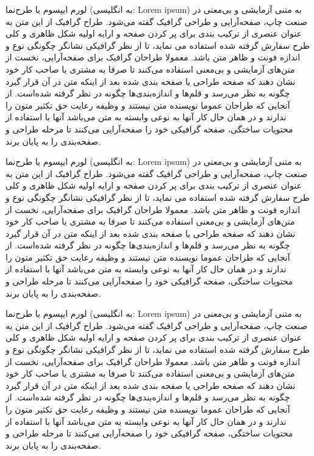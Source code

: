 \documentclass[a4paper, 12pt]{exam}
\begin{document}
\begin{questions}
	\question
	لورم ایپسوم یا طرح‌نما (به انگلیسی: Lorem ipsum) به متنی آزمایشی و بی‌معنی در صنعت چاپ، صفحه‌آرایی و طراحی گرافیک گفته می‌شود. طراح گرافیک از این متن به عنوان عنصری از ترکیب بندی برای پر کردن صفحه و ارایه اولیه شکل ظاهری و کلی طرح سفارش گرفته شده استفاده می نماید، تا از نظر گرافیکی نشانگر چگونگی نوع و اندازه فونت و ظاهر متن باشد. معمولا طراحان گرافیک برای صفحه‌آرایی، نخست از متن‌های آزمایشی و بی‌معنی استفاده می‌کنند تا صرفا به مشتری یا صاحب کار خود نشان دهند که صفحه طراحی یا صفحه بندی شده بعد از اینکه متن در آن قرار گیرد چگونه به نظر می‌رسد و قلم‌ها و اندازه‌بندی‌ها چگونه در نظر گرفته شده‌است. از آنجایی که طراحان عموما نویسنده متن نیستند و وظیفه رعایت حق تکثیر متون را ندارند و در همان حال کار آنها به نوعی وابسته به متن می‌باشد آنها با استفاده از محتویات ساختگی، صفحه گرافیکی خود را صفحه‌آرایی می‌کنند تا مرحله طراحی و صفحه‌بندی را به پایان برند.
\end{questions}

\begin{questions}
	\question
	لورم ایپسوم یا طرح‌نما (به انگلیسی: Lorem ipsum) به متنی آزمایشی و بی‌معنی در صنعت چاپ، صفحه‌آرایی و طراحی گرافیک گفته می‌شود. طراح گرافیک از این متن به عنوان عنصری از ترکیب بندی برای پر کردن صفحه و ارایه اولیه شکل ظاهری و کلی طرح سفارش گرفته شده استفاده می نماید، تا از نظر گرافیکی نشانگر چگونگی نوع و اندازه فونت و ظاهر متن باشد. معمولا طراحان گرافیک برای صفحه‌آرایی، نخست از متن‌های آزمایشی و بی‌معنی استفاده می‌کنند تا صرفا به مشتری یا صاحب کار خود نشان دهند که صفحه طراحی یا صفحه بندی شده بعد از اینکه متن در آن قرار گیرد چگونه به نظر می‌رسد و قلم‌ها و اندازه‌بندی‌ها چگونه در نظر گرفته شده‌است. از آنجایی که طراحان عموما نویسنده متن نیستند و وظیفه رعایت حق تکثیر متون را ندارند و در همان حال کار آنها به نوعی وابسته به متن می‌باشد آنها با استفاده از محتویات ساختگی، صفحه گرافیکی خود را صفحه‌آرایی می‌کنند تا مرحله طراحی و صفحه‌بندی را به پایان برند.
	
	
	\question
	لورم ایپسوم یا طرح‌نما (به انگلیسی: Lorem ipsum) به متنی آزمایشی و بی‌معنی در صنعت چاپ، صفحه‌آرایی و طراحی گرافیک گفته می‌شود. طراح گرافیک از این متن به عنوان عنصری از ترکیب بندی برای پر کردن صفحه و ارایه اولیه شکل ظاهری و کلی طرح سفارش گرفته شده استفاده می نماید، تا از نظر گرافیکی نشانگر چگونگی نوع و اندازه فونت و ظاهر متن باشد. معمولا طراحان گرافیک برای صفحه‌آرایی، نخست از متن‌های آزمایشی و بی‌معنی استفاده می‌کنند تا صرفا به مشتری یا صاحب کار خود نشان دهند که صفحه طراحی یا صفحه بندی شده بعد از اینکه متن در آن قرار گیرد چگونه به نظر می‌رسد و قلم‌ها و اندازه‌بندی‌ها چگونه در نظر گرفته شده‌است. از آنجایی که طراحان عموما نویسنده متن نیستند و وظیفه رعایت حق تکثیر متون را ندارند و در همان حال کار آنها به نوعی وابسته به متن می‌باشد آنها با استفاده از محتویات ساختگی، صفحه گرافیکی خود را صفحه‌آرایی می‌کنند تا مرحله طراحی و صفحه‌بندی را به پایان برند.
\end{questions}
\end{document}
